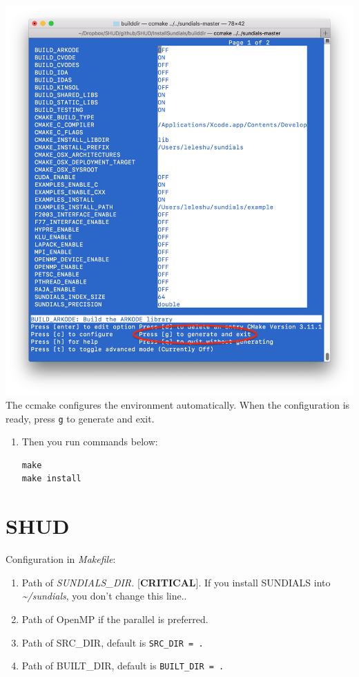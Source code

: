 \documentclass[]{scrbook}
\providecommand{\tightlist}{%
  \setlength{\itemsep}{0pt}\setlength{\parskip}{0pt}}
\begin{document}
\includegraphics{Fig/ccmake/3.png} The ccmake configures the environment
automatically. When the configuration is ready, press \texttt{g} to
generate and exit.

\begin{enumerate}
\def\labelenumi{\arabic{enumi}.}
\item
  Then you run commands below:

\begin{verbatim}
make
make install 
\end{verbatim}
\end{enumerate}

\section{SHUD}\label{shud}

Configuration in \emph{Makefile}:

\begin{enumerate}
\def\labelenumi{\arabic{enumi}.}
\tightlist
\item
  Path of \emph{SUNDIALS\_DIR.} {[}\textbf{CRITICAL}{]}. If you install
  SUNDIALS into \emph{\textasciitilde{}/sundials}, you don't change this
  line..
\item
  Path of OpenMP if the parallel is preferred.
\item
  Path of SRC\_DIR, default is \texttt{SRC\_DIR\ =\ .}
\item
  Path of BUILT\_DIR, default is \texttt{BUILT\_DIR\ =\ .}
\end{enumerate}
\end{document}
